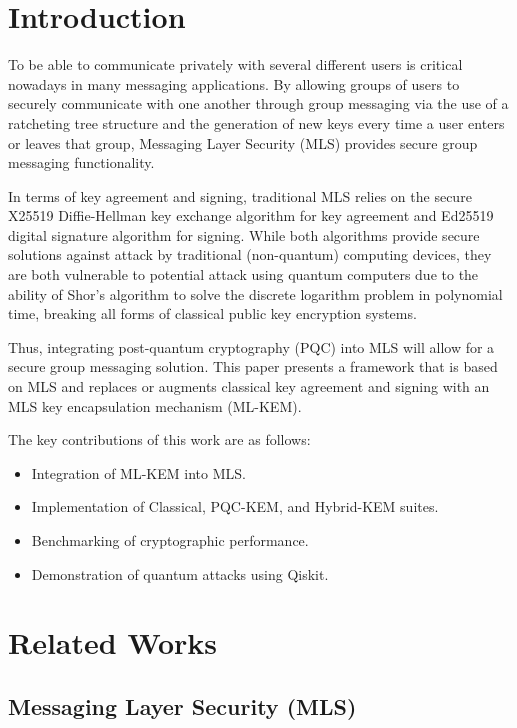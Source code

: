 \documentclass{ieeeaccess}
\begin{document}
\titlepgskip=-15pt
\maketitle

\section{Introduction}
To be able to communicate privately with several different users is critical nowadays in many messaging applications. By allowing groups of users to securely communicate with one another through group messaging via the use of a ratcheting tree structure and the generation of new keys every time a user enters or leaves that group, Messaging Layer Security (MLS) provides secure group messaging functionality.

In terms of key agreement and signing, traditional MLS relies on the secure X25519 Diffie-Hellman key exchange algorithm for key agreement and Ed25519 digital signature algorithm for signing. While both algorithms provide secure solutions against attack by traditional (non-quantum) computing devices, they are both vulnerable to potential attack using quantum computers due to the ability of Shor’s algorithm to solve the discrete logarithm problem in polynomial time, breaking all forms of classical public key encryption systems.

Thus, integrating post-quantum cryptography (PQC) into MLS will allow for a secure group messaging solution. This paper presents a framework that is based on MLS and replaces or augments classical key agreement and signing with an MLS key encapsulation mechanism (ML-KEM).

The key contributions of this work are as follows:
\begin{itemize}
\item Integration of ML-KEM into MLS.
\item Implementation of Classical, PQC-KEM, and Hybrid-KEM suites.
\item Benchmarking of cryptographic performance.
\item Demonstration of quantum attacks using Qiskit.
\end{itemize}

\section{Related Works}

\subsection{Messaging Layer Security (MLS)}
\end{document}
